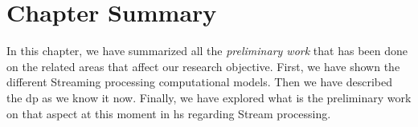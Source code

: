 \section{Chapter Summary}
In this chapter, we have summarized all the \emph{preliminary work} that has been done on the related areas that affect our research objective.
First, we have shown the different Streaming processing computational models. Then we have described the \acrshort{dp} as we know it now. 
Finally, we have explored what is the preliminary work on that aspect at this moment in \acrshort{hs} regarding Stream processing. 
